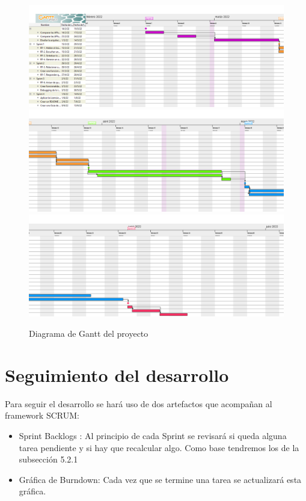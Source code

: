 \begin{figure}[h]
	\centering
	\includegraphics[width=\textwidth]{imagenes/Gantt1.png} \\
	\includegraphics[width=\textwidth]{imagenes/Gantt2.png} \\
	\includegraphics[width=\textwidth]{imagenes/Gantt3.png} \\
	\caption{Diagrama de Gantt del proyecto}
	\label{fig:gantt}
\end{figure}


\section{Seguimiento del desarrollo}
Para seguir el desarrollo se hará uso de dos artefactos que acompañan al framework SCRUM:
\begin{itemize}
	\item Sprint Backlogs : Al principio de cada Sprint se revisará si queda alguna tarea pendiente y si hay que recalcular algo. Como base tendremos los de la subsección 5.2.1
	\item Gráfica de Burndown: Cada vez que se termine una tarea se actualizará esta gráfica.
\end{itemize}


